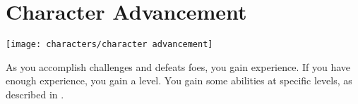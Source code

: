 \section{Character Advancement}\label{Character Advancement}
    \texttt{[image: characters/character advancement]}

    As you accomplish challenges and defeats foes, you gain experience.
    If you have enough experience, you gain a level.
    You gain some abilities at specific levels, as described in .


